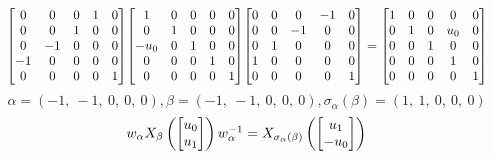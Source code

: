 \documentclass[11pt]{article}
\theoremstyle{definition}
\begin{document}
\[
\scaletoalign{\textwidth}{{\left[\begin{matrix}0 & 0 & 0 & 1 & 0\\0 & 0 & 1 & 0 & 0\\0 & -1 & 0 & 0 & 0\\-1 & 0 & 0 & 0 & 0\\0 & 0 & 0 & 0 & 1\end{matrix}\right]} {\left[\begin{matrix}1 & 0 & 0 & 0 & 0\\0 & 1 & 0 & 0 & 0\\- u_{0} & 0 & 1 & 0 & 0\\0 & 0 & 0 & 1 & 0\\0 & 0 & 0 & 0 & 1\end{matrix}\right]} {\left[\begin{matrix}0 & 0 & 0 & -1 & 0\\0 & 0 & -1 & 0 & 0\\0 & 1 & 0 & 0 & 0\\1 & 0 & 0 & 0 & 0\\0 & 0 & 0 & 0 & 1\end{matrix}\right]} = {\left[\begin{matrix}1 & 0 & 0 & 0 & 0\\0 & 1 & 0 & u_{0} & 0\\0 & 0 & 1 & 0 & 0\\0 & 0 & 0 & 1 & 0\\0 & 0 & 0 & 0 & 1\end{matrix}\right]}}
\]
\[
\alpha = \left( -1, \  -1, \  0, \  0, \  0\right), \beta = \left( -1, \  -1, \  0, \  0, \  0\right), \sigma_{\alpha}(\beta) = \left( 1, \  1, \  0, \  0, \  0\right)
\]
\[
\scaletoalign{\textwidth}{w_{\alpha} X_{\beta}\left(\left[\begin{matrix}u_{0}\\u_{1}\end{matrix}\right]\right) w_{\alpha}^{-1} = X_{\sigma_{\alpha}\left(\beta\right)}\left(\left[\begin{matrix}u_{1}\\- u_{0}\end{matrix}\right]\right)}
\]
\end{document}

